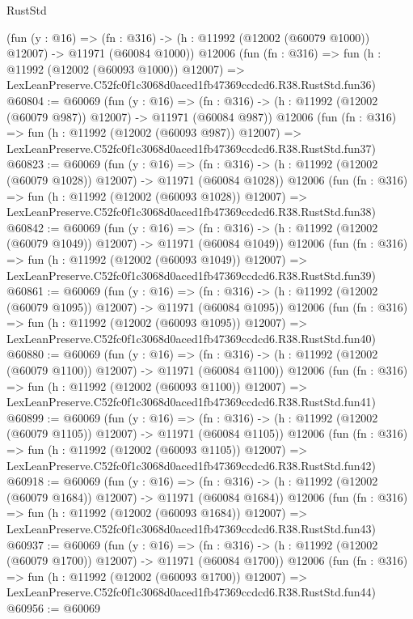 \begin{lexlean}{RustStd}
\begin{coremodule}
    (fun (y : @16) =>
    (fn : @316) -> (h : @11992 (@12002 (@60079 @1000)) @12007) -> @11971 (@60084 @1000))
    @12006
    (fun (fn : @316) =>
    fun (h : @11992 (@12002 (@60093 @1000)) @12007) =>
    LexLeanPreserve.C52fc0f1c3068d0aced1fb47369ccdcd6.R38.RustStd.fun36)
@60804 := @60069
    (fun (y : @16) =>
    (fn : @316) -> (h : @11992 (@12002 (@60079 @987)) @12007) -> @11971 (@60084 @987))
    @12006
    (fun (fn : @316) =>
    fun (h : @11992 (@12002 (@60093 @987)) @12007) =>
    LexLeanPreserve.C52fc0f1c3068d0aced1fb47369ccdcd6.R38.RustStd.fun37)
@60823 := @60069
    (fun (y : @16) =>
    (fn : @316) -> (h : @11992 (@12002 (@60079 @1028)) @12007) -> @11971 (@60084 @1028))
    @12006
    (fun (fn : @316) =>
    fun (h : @11992 (@12002 (@60093 @1028)) @12007) =>
    LexLeanPreserve.C52fc0f1c3068d0aced1fb47369ccdcd6.R38.RustStd.fun38)
@60842 := @60069
    (fun (y : @16) =>
    (fn : @316) -> (h : @11992 (@12002 (@60079 @1049)) @12007) -> @11971 (@60084 @1049))
    @12006
    (fun (fn : @316) =>
    fun (h : @11992 (@12002 (@60093 @1049)) @12007) =>
    LexLeanPreserve.C52fc0f1c3068d0aced1fb47369ccdcd6.R38.RustStd.fun39)
@60861 := @60069
    (fun (y : @16) =>
    (fn : @316) -> (h : @11992 (@12002 (@60079 @1095)) @12007) -> @11971 (@60084 @1095))
    @12006
    (fun (fn : @316) =>
    fun (h : @11992 (@12002 (@60093 @1095)) @12007) =>
    LexLeanPreserve.C52fc0f1c3068d0aced1fb47369ccdcd6.R38.RustStd.fun40)
@60880 := @60069
    (fun (y : @16) =>
    (fn : @316) -> (h : @11992 (@12002 (@60079 @1100)) @12007) -> @11971 (@60084 @1100))
    @12006
    (fun (fn : @316) =>
    fun (h : @11992 (@12002 (@60093 @1100)) @12007) =>
    LexLeanPreserve.C52fc0f1c3068d0aced1fb47369ccdcd6.R38.RustStd.fun41)
@60899 := @60069
    (fun (y : @16) =>
    (fn : @316) -> (h : @11992 (@12002 (@60079 @1105)) @12007) -> @11971 (@60084 @1105))
    @12006
    (fun (fn : @316) =>
    fun (h : @11992 (@12002 (@60093 @1105)) @12007) =>
    LexLeanPreserve.C52fc0f1c3068d0aced1fb47369ccdcd6.R38.RustStd.fun42)
@60918 := @60069
    (fun (y : @16) =>
    (fn : @316) -> (h : @11992 (@12002 (@60079 @1684)) @12007) -> @11971 (@60084 @1684))
    @12006
    (fun (fn : @316) =>
    fun (h : @11992 (@12002 (@60093 @1684)) @12007) =>
    LexLeanPreserve.C52fc0f1c3068d0aced1fb47369ccdcd6.R38.RustStd.fun43)
@60937 := @60069
    (fun (y : @16) =>
    (fn : @316) -> (h : @11992 (@12002 (@60079 @1700)) @12007) -> @11971 (@60084 @1700))
    @12006
    (fun (fn : @316) =>
    fun (h : @11992 (@12002 (@60093 @1700)) @12007) =>
    LexLeanPreserve.C52fc0f1c3068d0aced1fb47369ccdcd6.R38.RustStd.fun44)
@60956 := @60069

\end{coremodule}
\end{lexlean}

